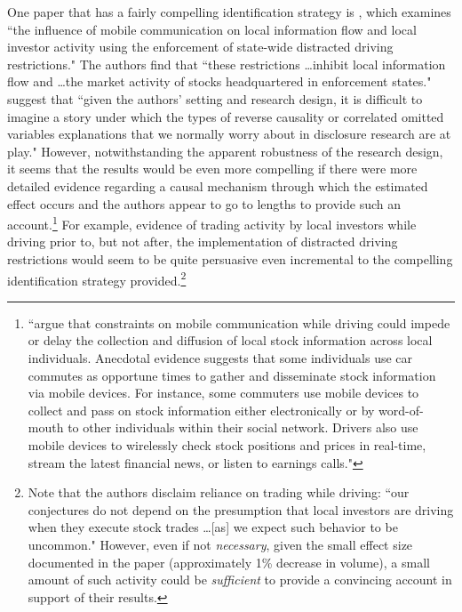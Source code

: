 \documentclass[12pt,reqno,titlepage]{amsart}
\begin{document}
\begin{doublespace}
One paper that has a fairly compelling identification strategy is \citet{Brown:2015ik}, which examines ``the influence of mobile communication on local information flow and local investor activity using the enforcement of state-wide distracted driving restrictions."
The authors find that ``these restrictions \dots inhibit local information flow and \dots the market activity of stocks headquartered in enforcement states."
\citet[p.\,229]{Miller:2015ec} suggest that ``given the authors' setting and research design, it is difficult to imagine a story under which the types of reverse causality or correlated omitted variables explanations that we normally worry about in disclosure research are at play."
However, notwithstanding the apparent robustness of the research design, it seems that the results would be even more compelling if there were more detailed evidence regarding a causal mechanism through which the estimated effect occurs and the authors appear to go to lengths to provide such an account.\footnote{
\citet[pp.\,277-278]{Brown:2015ik} ``argue that constraints on mobile communication while driving could impede or delay the collection and diffusion of local stock information across local individuals. 
Anecdotal evidence suggests that some individuals use car commutes as opportune times to gather and disseminate stock information via mobile devices. 
For instance, some commuters use mobile devices to collect and pass on stock information either electronically or by word-of-mouth to other individuals within their social network.
Drivers also use mobile devices to wirelessly check stock positions and prices in real-time, stream the latest financial news, or listen to earnings calls."}
For example, evidence of trading activity by local investors while driving prior to, but not after, the implementation of distracted driving restrictions would seem to be quite persuasive even incremental to the compelling identification strategy provided.\footnote{
Note that the authors disclaim reliance on trading while driving: ``our conjectures do not depend on the presumption that local investors are driving when they execute stock trades \dots [as] we expect such behavior to be uncommon."
However, even if not \emph{necessary}, given the small effect size documented in the paper (approximately 1\% decrease in volume), a small amount of such activity could be \emph{sufficient} to provide a convincing account in support of their results.}


\end{doublespace}
\end{document}
